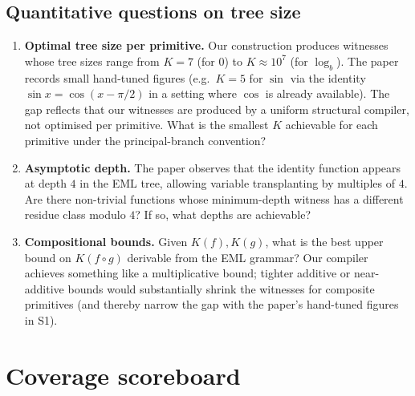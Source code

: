 \documentclass[11pt]{article}
\theoremstyle{plain}
\theoremstyle{definition}
\begin{document}
\subsection*{Quantitative questions on tree size}

\begin{enumerate}[topsep=2pt, itemsep=4pt, label=\textbf{S\arabic*}]
\item \textbf{Optimal tree size per primitive.}
  Our construction produces witnesses whose tree sizes range from
  $K = 7$ (for $0$) to $K \approx 10^{7}$ (for $\log_b$). The paper
  records small hand-tuned figures (e.g.\ $K = 5$ for $\sin$ via the
  identity $\sin x = \cos(x - \pi/2)$ in a setting where $\cos$ is
  already available). The gap reflects that our witnesses are
  produced by a uniform structural compiler, not optimised per
  primitive. What is the smallest $K$ achievable for each primitive
  under the principal-branch convention?

\item \textbf{Asymptotic depth.}
  The paper observes that the identity function appears at depth $4$
  in the EML tree, allowing variable transplanting by multiples of
  $4$. Are there non-trivial functions whose minimum-depth witness has
  a different residue class modulo $4$? If so, what depths are
  achievable?

\item \textbf{Compositional bounds.}
  Given $K(f), K(g)$, what is the best upper bound on $K(f \circ g)$
  derivable from the EML grammar? Our compiler achieves something like
  a multiplicative bound; tighter additive or near-additive bounds
  would substantially shrink the witnesses for composite primitives
  (and thereby narrow the gap with the paper's hand-tuned figures
  in S1).
\end{enumerate}

\section{Coverage scoreboard}
\end{document}
